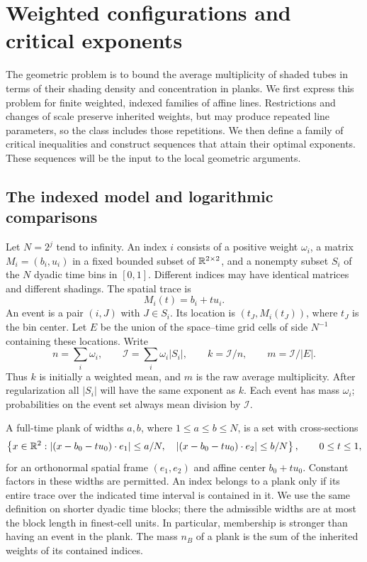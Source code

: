 \section{Weighted configurations and critical exponents}
\label{sec:critical}

The geometric problem is to bound the average multiplicity of shaded tubes
in terms of their shading density and concentration in planks. We first
express this problem for finite weighted, indexed families of affine lines.
Restrictions and changes of scale preserve inherited weights, but may
produce repeated line parameters, so the class includes those repetitions.
We then define a family of critical inequalities and construct sequences
that attain their optimal exponents. These sequences will be the input to
the local geometric arguments.

\subsection{The indexed model and logarithmic comparisons}

Let $N=2^j$ tend to infinity.  An index $i$ consists of a positive weight
$\omega_i$, a matrix $M_i=(b_i,u_i)$ in a fixed bounded subset of
$\mathbb R^{2\times2}$, and a nonempty subset $S_i$ of the $N$ dyadic time bins in
$[0,1]$.  Different indices may have identical matrices and different
shadings.  The spatial trace is
\[
 M_i(t)=b_i+tu_i.
\]
An event is a pair $(i,J)$ with $J\in S_i$.  Its location is
$(t_J,M_i(t_J))$, where $t_J$ is the bin center.  Let $E$ be the union of the
space--time grid cells of side $N^{-1}$ containing these locations.  Write
\begin{equation}\label{eq:indexed-incidence}
 n=\sum_i\omega_i,
 \qquad \mathcal I=\sum_i\omega_i|S_i|,
 \qquad k=\mathcal I/n,
 \qquad m=\mathcal I/|E|.
\end{equation}
Thus $k$ is initially a weighted mean, and $m$ is the raw average
multiplicity.  After regularization all $|S_i|$ will have the same exponent
as $k$.  Each event has mass $\omega_i$; probabilities on the event set
always mean division by $\mathcal I$.

A full-time plank of widths $a,b$, where $1\le a\le b\le N$, is a set with
cross-sections
\[
 \left\{x\in\mathbb R^2:
 |(x-b_0-tu_0)\cdot e_1|\le a/N,
 \quad |(x-b_0-tu_0)\cdot e_2|\le b/N\right\},
 \qquad 0\le t\le1,
\]
for an orthonormal spatial frame $(e_1,e_2)$ and affine center $b_0+tu_0$.
Constant factors in these widths are permitted.  An index belongs to a
plank only if its entire trace over the indicated time interval is
contained in it.  We use the same definition on shorter dyadic time blocks;
there the admissible widths are at most the block length in finest-cell
units.  In particular, membership is stronger than having an event in the
plank.  The mass $n_B$ of a plank is the sum of the inherited weights of its
contained indices.

